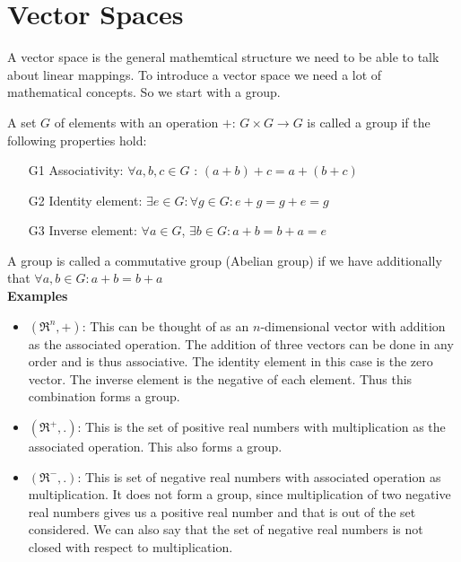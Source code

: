 	\chapter{Vector Spaces}
	
	A vector space is the general mathemtical structure we need to be able to talk about linear mappings. To introduce a vector space we need a lot of mathematical concepts. So we start with a group. 
	
	\begin{definition}
		A set $G$ of elements with an operation $+$: $G \times G \rightarrow G$ is called a group if the following properties hold: 
	\end{definition}
	
	\begin{itemize}
		\item[G1] Associativity: $ \forall a, b, c \in G$ : $(a + b) + c = a + (b + c) $
		\item[G2] Identity element: $\exists e \in G: \forall g \in G: e + g = g + e = g $
		\item[G3] Inverse element: $ \forall a \in G$, $ \exists b \in G : a + b = b + a = e$
	\end{itemize}
	
	A group is called a commutative group (Abelian group) if we have additionally that $ \forall a, b \in G: a + b = b + a$ \\
	
	\textbf{Examples}
	
	\begin{itemize}
		\item $(\Re^n, +)$: This can be thought of as an $n$-dimensional vector with addition as the associated operation. The addition of three vectors can be done in any order and is thus associative. The identity element in this case is the zero vector. The inverse element is the negative of each element. Thus this combination forms a group. 
		
		\item $(\Re^+, .)$: This is the set of positive real numbers with multiplication as the associated operation. This also forms a group. 
		
		\item $(\Re^-, .)$: This is set of negative real numbers with associated operation as multiplication. It does not form a group, since multiplication of two negative real numbers gives us a positive real number and that is out of the set considered. We can also say that the set of negative real numbers is not closed with respect to multiplication. 
		
	\end{itemize}

